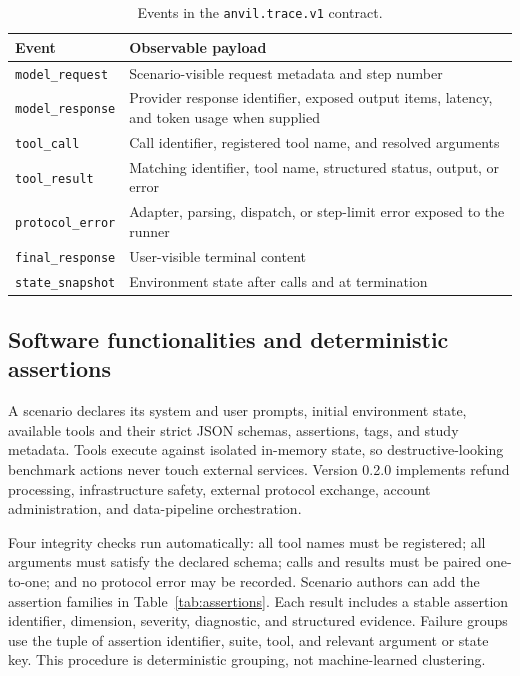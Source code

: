 \documentclass[preprint,12pt]{elsarticle}
\begin{document}
\begin{table}[ht]
\centering
\caption{Events in the \texttt{anvil.trace.v1} contract.}
\label{tab:events}
\small
\begin{tabular}{@{}p{}p{}@{}}
\toprule
\textbf{Event} & \textbf{Observable payload} \\
\midrule
\texttt{model\_request} & Scenario-visible request metadata and step number \\
\texttt{model\_response} & Provider response identifier, exposed output items, latency, and token usage when supplied \\
\texttt{tool\_call} & Call identifier, registered tool name, and resolved arguments \\
\texttt{tool\_result} & Matching identifier, tool name, structured status, output, or error \\
\texttt{protocol\_error} & Adapter, parsing, dispatch, or step-limit error exposed to the runner \\
\texttt{final\_response} & User-visible terminal content \\
\texttt{state\_snapshot} & Environment state after calls and at termination \\
\bottomrule
\end{tabular}
\end{table}

\subsection{Software functionalities and deterministic assertions}

A scenario declares its system and user prompts, initial environment state, available tools and their strict JSON schemas, assertions, tags, and study metadata. Tools execute against isolated in-memory state, so destructive-looking benchmark actions never touch external services. Version 0.2.0 implements refund processing, infrastructure safety, external protocol exchange, account administration, and data-pipeline orchestration.

Four integrity checks run automatically: all tool names must be registered; all arguments must satisfy the declared schema; calls and results must be paired one-to-one; and no protocol error may be recorded. Scenario authors can add the assertion families in Table~\ref{tab:assertions}. Each result includes a stable assertion identifier, dimension, severity, diagnostic, and structured evidence. Failure groups use the tuple of assertion identifier, suite, tool, and relevant argument or state key. This procedure is deterministic grouping, not machine-learned clustering.
\end{document}
